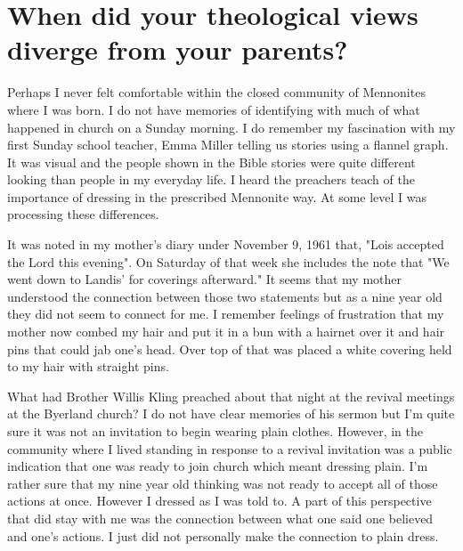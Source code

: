 \section{When did your theological views diverge from your parents?} %
Perhaps I never felt comfortable within the closed community of Mennonites where I was born.
I do not have memories of identifying with much of what happened in church on a Sunday morning.
I do remember my fascination with my first Sunday school teacher, Emma Miller telling us stories using a flannel graph.
It was visual and the people shown in the Bible stories were quite different looking than people in my everyday life.
I heard the preachers teach of the importance of dressing in the prescribed Mennonite way.
At some level I was processing these differences.

It was noted in my mother's diary under November 9, 1961 that, "Lois accepted the Lord this evening".
On Saturday of that week she includes the note that "We went down to Landis' for coverings afterward." 
It seems that my mother understood the connection between those two statements but as a nine year old they did not seem to connect for me.
I remember feelings of frustration that my mother now combed my hair and put it in a bun with a hairnet over it and hair pins that could jab one's head.
Over top of that was placed a white covering held to my hair with straight pins.

What had Brother Willis Kling preached about that night at the revival meetings at the Byerland church? I do not have clear memories of his sermon but I'm quite sure it was not an invitation to begin wearing plain clothes.
However, in the community where I lived standing in response to a revival invitation was a public indication that one was ready to join church which meant dressing plain.
I'm rather sure that my nine year old thinking was not ready to accept all of those actions at once.
However I dressed as I was told to.
A part of this perspective that did stay with me was the connection between what one said one believed and one's actions.
I just did not personally make the connection to plain dress.

